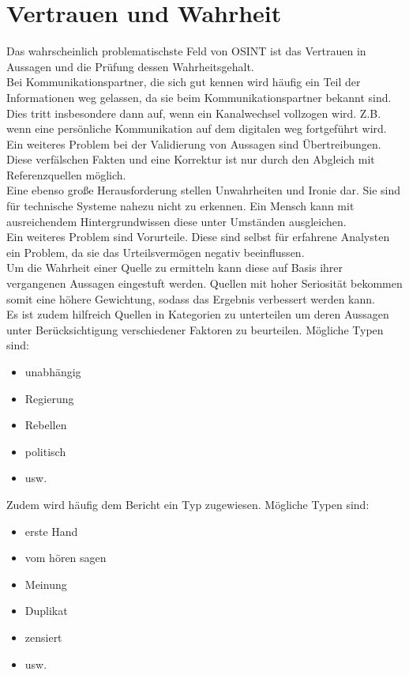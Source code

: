 \documentclass[twoside,a4paper]{article}
\begin{document}
\section{Vertrauen und Wahrheit}
Das wahrscheinlich problematischste Feld von OSINT ist das Vertrauen in Aussagen und die Prüfung dessen Wahrheitsgehalt.\\
Bei Kommunikationspartner, die sich gut kennen wird häufig ein Teil der Informationen weg gelassen, da sie beim Kommunikationspartner bekannt sind. Dies tritt insbesondere dann auf, wenn ein Kanalwechsel vollzogen wird. Z.B. wenn eine persönliche Kommunikation auf dem digitalen weg fortgeführt wird.\\
Ein weiteres Problem bei der Validierung von Aussagen sind Übertreibungen. Diese verfälschen Fakten und eine Korrektur ist nur durch den Abgleich mit Referenzquellen möglich.\\
Eine ebenso große Herausforderung stellen Unwahrheiten und Ironie dar. Sie sind für technische Systeme nahezu nicht zu erkennen. Ein Mensch kann mit ausreichendem Hintergrundwissen diese unter Umständen ausgleichen.\\
Ein weiteres Problem sind Vorurteile. Diese sind selbst für erfahrene Analysten ein Problem, da sie das Urteilsvermögen negativ beeinflussen.\\
Um die Wahrheit einer Quelle zu ermitteln kann diese auf Basis ihrer vergangenen Aussagen eingestuft werden. Quellen mit hoher Seriosität bekommen somit eine höhere Gewichtung, sodass das Ergebnis verbessert werden kann.\\
Es ist zudem hilfreich Quellen in Kategorien zu unterteilen um deren Aussagen unter Berücksichtigung verschiedener Faktoren zu beurteilen. Mögliche Typen sind:
\begin{itemize}
	\item unabhängig
	\item Regierung
	\item Rebellen
	\item politisch
	\item usw.
\end{itemize}
Zudem wird häufig dem Bericht ein Typ zugewiesen. Mögliche Typen sind:
\begin{itemize}
	\item erste Hand
	\item vom hören sagen
	\item Meinung
	\item Duplikat
	\item zensiert
	\item usw.
\end{itemize}
\end{document}
